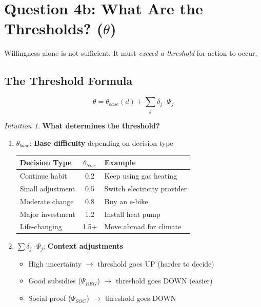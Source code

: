 \documentclass[11pt,a4paper]{book}
\theoremstyle{definition}
\theoremstyle{remark}
\newtheorem*{intuition}{Intuition}
\begin{document}
\section{Question 4b: What Are the Thresholds? ($\theta$)}
\label{sec:12-theta}

Willingness alone is not sufficient. It must \textit{exceed a threshold} for action to occur.

\subsection{The Threshold Formula}

\begin{equation}
\boxed{\theta = \theta_{base}(d) + \sum_j \delta_j \cdot \Psi_j}
\end{equation}

\begin{intuition}
\textbf{What determines the threshold?}

\begin{enumerate}
\item $\theta_{base}$: \textbf{Base difficulty} depending on decision type

\begin{center}
\begin{tabular}{lcp{5cm}}
\toprule
\textbf{Decision Type} & $\theta_{base}$ & \textbf{Example}\\
\midrule
Continue habit & 0.2 & Keep using gas heating\\
Small adjustment & 0.5 & Switch electricity provider\\
Moderate change & 0.8 & Buy an e-bike\\
Major investment & 1.2 & Install heat pump\\
Life-changing & 1.5+ & Move abroad for climate\\
\bottomrule
\end{tabular}
\end{center}

\item $\sum \delta_j \cdot \Psi_j$: \textbf{Context adjustments}
\begin{itemize}
\item High uncertainty $\rightarrow$ threshold goes UP (harder to decide)
\item Good subsidies ($\Psi_{REG}$) $\rightarrow$ threshold goes DOWN (easier)
\item Social proof ($\Psi_{SOC}$) $\rightarrow$ threshold goes DOWN
\end{itemize}
\end{enumerate}
\end{intuition}
\end{document}
